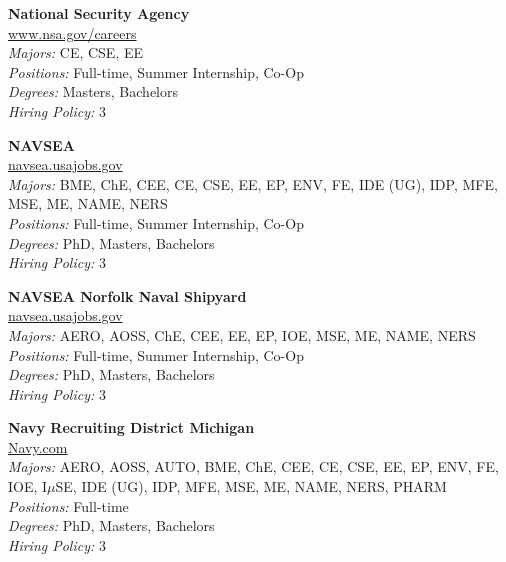 \documentclass[twoside]{article}
\begin{document}
\begin{center}
\begin{multicols}{3}
\begin{minipage}{.9\columnwidth}{\Large\bf National Security Agency }\\
	\url{www.nsa.gov/careers}\\
	\emph{Majors:} CE, CSE, EE\\
	\emph{Positions:} Full-time, Summer Internship, Co-Op\\
	\emph{Degrees:} Masters, Bachelors\\
	\emph{Hiring Policy:} 3\\
\end{minipage}
 
\begin{minipage}{.9\columnwidth}{\Large\bf NAVSEA }\\
	\url{navsea.usajobs.gov}\\
	\emph{Majors:} BME, ChE, CEE, CE, CSE, EE, EP, ENV, FE, IDE (UG), IDP, MFE, MSE, ME, NAME, NERS\\
	\emph{Positions:} Full-time, Summer Internship, Co-Op\\
	\emph{Degrees:} PhD, Masters, Bachelors\\
	\emph{Hiring Policy:} 3\\
\end{minipage}
 
\begin{minipage}{.9\columnwidth}{\Large\bf NAVSEA Norfolk Naval Shipyard }\\
	\url{navsea.usajobs.gov}\\
	\emph{Majors:} AERO, AOSS, ChE, CEE, EE, EP, IOE, MSE, ME, NAME, NERS\\
	\emph{Positions:} Full-time, Summer Internship, Co-Op\\
	\emph{Degrees:} PhD, Masters, Bachelors\\
	\emph{Hiring Policy:} 3\\
\end{minipage}
 
\begin{minipage}{.9\columnwidth}{\Large\bf Navy Recruiting District Michigan }\\
	\url{Navy.com}\\
	\emph{Majors:} AERO, AOSS, AUTO, BME, ChE, CEE, CE, CSE, EE, EP, ENV, FE, IOE, I$\mu$SE, IDE (UG), IDP, MFE, MSE, ME, NAME, NERS, PHARM\\
	\emph{Positions:} Full-time\\
	\emph{Degrees:} PhD, Masters, Bachelors\\
	\emph{Hiring Policy:} 3\\
\end{minipage}
 

\end{multicols}
\end{center}
\end{document}
